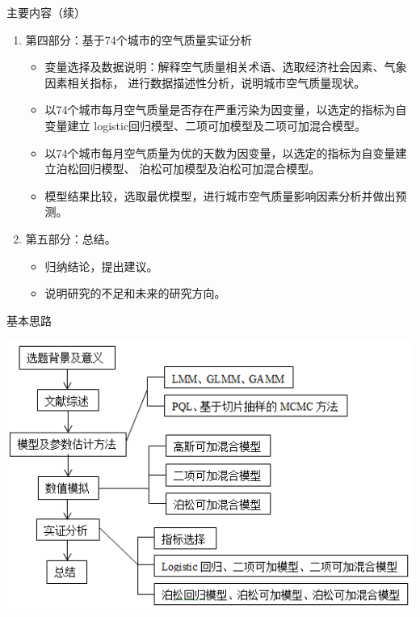 \documentclass[ignorenonframetext,11pt,xcolor=dvipsnames,aspectratio=1610,hyperref={bookmarksdepth=4}]{beamer}
\providecommand{\tightlist}{%
  \setlength{\itemsep}{0pt}\setlength{\parskip}{0pt}}
\begin{document}
\begin{frame}{主要内容（续）}

\begin{enumerate}
\def\labelenumi{\arabic{enumi}.}
\setcounter{enumi}{3}
\tightlist
\item
  第四部分：基于74个城市的空气质量实证分析

  \begin{itemize}
  \tightlist
  \item
    变量选择及数据说明：解释空气质量相关术语、选取经济社会因素、气象因素相关指标，
    进行数据描述性分析，说明城市空气质量现状。
  \item
    以74个城市每月空气质量是否存在严重污染为因变量，以选定的指标为自变量建立
    logistic回归模型、二项可加模型及二项可加混合模型。
  \item
    以74个城市每月空气质量为优的天数为因变量，以选定的指标为自变量建立泊松回归模型、
    泊松可加模型及泊松可加混合模型。
  \item
    模型结果比较，选取最优模型，进行城市空气质量影响因素分析并做出预测。
  \end{itemize}
\item
  第五部分：总结。

  \begin{itemize}
  \tightlist
  \item
    归纳结论，提出建议。
  \item
    说明研究的不足和未来的研究方向。
  \end{itemize}
\end{enumerate}

\end{frame}

\begin{frame}{基本思路}

\includegraphics{sl.png}

\end{frame}
\end{document}
